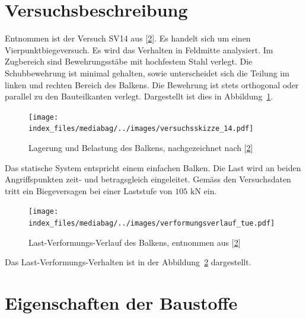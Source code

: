 \documentclass[
  12pt,
  letterpaper,
  egregdoesnotlikesansseriftitles]{scrreprt}
\begin{document}
\hypertarget{versuchsbeschreibung-1}{%
\section{Versuchsbeschreibung}\label{versuchsbeschreibung-1}}

Entnommen ist der Versuch SV14 aus
{[}\protect\hyperlink{ref-Tue2019}{2}{]}. Es handelt sich um einen
Vierpunktbiegeversuch. Es wird das Verhalten in Feldmitte analysiert. Im
Zugbereich sind Bewehrungsstäbe mit hochfestem Stahl verlegt. Die
Schubbewehrung ist minimal gehalten, sowie unterscheidet sich die
Teilung im linken und rechten Bereich des Balkens. Die Bewehrung ist
stets orthogonal oder parallel zu den Bauteilkanten verlegt. Dargestellt
ist dies in Abbildung~\ref{fig-system_sv14}.

\begin{figure}[H]

{\centering \texttt{[image: index\_files/mediabag/../images/versuchsskizze\_14.pdf]}

}

\caption{\label{fig-system_sv14}Lagerung und Belastung des Balkens,
nachgezeichnet nach {[}\protect\hyperlink{ref-Tue2019}{2}{]}}

\end{figure}

Das statische System entspricht einem einfachen Balken. Die Last wird an
beiden Angriffspunkten zeit- und betragsgleich eingeleitet. Gemäss den
Versuchsdaten tritt ein Biegeversagen bei einer Laststufe von
\(105 \text{ kN}\) ein.

\begin{figure}[H]

{\centering \texttt{[image: index\_files/mediabag/../images/verformungsverlauf\_tue.pdf]}

}

\caption{\label{fig-last_verformung_sv14}Last-Verformungs-Verlauf des
Balkens, entnommen aus {[}\protect\hyperlink{ref-Tue2019}{2}{]}}

\end{figure}

Das Last-Verformungs-Verhalten ist in der
Abbildung~\ref{fig-last_verformung_sv14} dargestellt.

\hypertarget{eigenschaften-der-baustoffe-1}{%
\section{Eigenschaften der
Baustoffe}\label{eigenschaften-der-baustoffe-1}}
\end{document}
